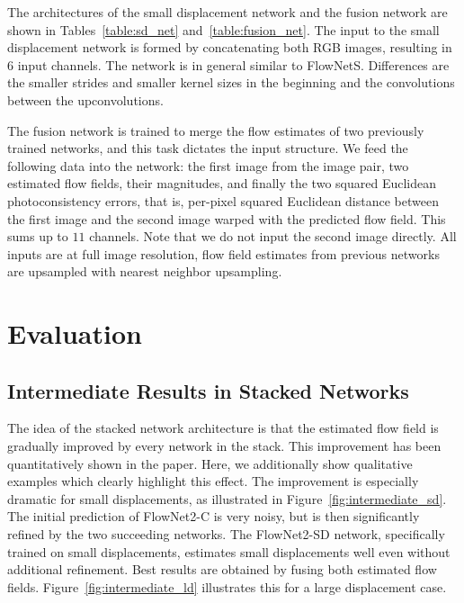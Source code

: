 \documentclass[10pt,twocolumn,letterpaper]{article}%
\begin{document}
The architectures of the small displacement network and the fusion network are shown in Tables~\ref{table:sd_net} and~\ref{table:fusion_net}. The input to the small displacement network is formed by concatenating both RGB images, resulting in $6$ input channels. The network is in general similar to FlowNetS. Differences are the smaller strides and smaller kernel sizes in the beginning and the convolutions between the upconvolutions. 

The fusion network is trained to merge the flow estimates of two previously trained networks, and this task dictates the input structure. 
We feed the following data into the network: the first image from the image pair, two estimated flow fields, their magnitudes, and finally the two squared Euclidean photoconsistency errors, that is, per-pixel squared Euclidean distance between the first image and the second image warped with the predicted flow field. 
This sums up to $11$ channels. Note that we do not input the second image directly. All inputs are at full image resolution, flow field estimates from previous networks are upsampled with nearest neighbor upsampling.



\section{Evaluation} 

\subsection{Intermediate Results in Stacked Networks}

The idea of the stacked network architecture is that the estimated flow field is gradually improved by every network in the stack. This improvement has been quantitatively shown in the paper. Here, we additionally show qualitative examples which clearly highlight this effect. The improvement is especially dramatic for small displacements, as illustrated in Figure~\ref{fig:intermediate_sd}. The initial prediction of FlowNet2-C is very noisy, but is then significantly refined by the two succeeding networks. The FlowNet2-SD network, specifically trained on small displacements, estimates small displacements well even without additional refinement. Best results are obtained by fusing both estimated flow fields. Figure~\ref{fig:intermediate_ld} illustrates this for a large displacement case. 
\end{document}
